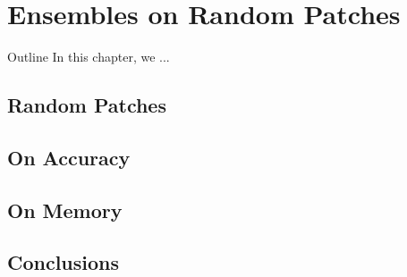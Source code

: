 \chapter{Ensembles on Random Patches}\label{ch:random-patches}


\begin{remark}{Outline}
In this chapter, we ...
\end{remark}


\section{Random Patches}

\section{On Accuracy}

\section{On Memory}

\section{Conclusions}
